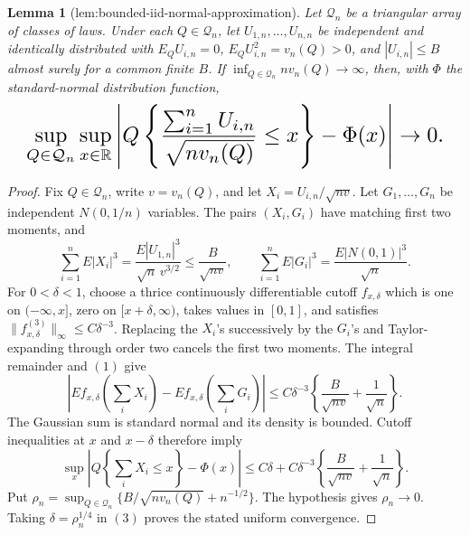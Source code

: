 \documentclass{article}
\newtheorem{lemma}{Lemma}
\begin{document}
\begin{lemma}[lem:bounded-iid-normal-approximation]\label{lem:bounded-iid-normal-approximation}
Let \(\mathcal Q_n\) be a triangular array of classes of laws. Under each \(Q\in\mathcal Q_n\), let \(U_{1,n},\ldots,U_{n,n}\) be independent and identically distributed with \(E_QU_{i,n}=0\), \(E_QU_{i,n}^2=v_n(Q)>0\), and \(|U_{i,n}|\le B\) almost surely for a common finite \(B\). If \(\inf_{Q\in\mathcal Q_n}nv_n(Q)\to\infty\), then, with \(\Phi\) the standard-normal distribution function,
\[
\makebox[\linewidth][c]{\resizebox{0.98\linewidth}{!}{\par\noindent \makebox[\linewidth][c]{\resizebox{0.98\linewidth}{!}{\(\displaystyle \displaystyle \sup_{Q\in\mathcal Q_n}\sup_{x\in\mathbb R}\left|Q\left\{\frac{\sum_{i=1}^nU_{i,n}}{\sqrt{nv_n(Q)}}\le x\right\}-\Phi(x)\right|\to0.\)}}\par\noindent}}
\]
\end{lemma}
\begin{proof}
Fix \(Q\in\mathcal Q_n\), write \(v=v_n(Q)\), and let \(X_i=U_{i,n}/\sqrt{nv}\). Let \(G_1,\ldots,G_n\) be independent \(N(0,1/n)\) variables. The pairs \((X_i,G_i)\) have matching first two moments, and
\[\sum_{i=1}^nE|X_i|^3=\frac{E|U_{1,n}|^3}{\sqrt n\,v^{3/2}}\le\frac{B}{\sqrt{nv}},\qquad \sum_{i=1}^nE|G_i|^3=\frac{E|N(0,1)|^3}{\sqrt n}.\tag{1}\]
For \(0<\delta<1\), choose a thrice continuously differentiable cutoff \(f_{x,\delta}\) which is one on \(( -\infty,x]\), zero on \([x+\delta,\infty)\), takes values in \([0,1]\), and satisfies \(\lVert f_{x,\delta}^{(3)}\rVert_\infty\le C\delta^{-3}\). Replacing the \(X_i\)'s successively by the \(G_i\)'s and Taylor-expanding through order two cancels the first two moments. The integral remainder and \((1)\) give
\[\left|Ef_{x,\delta}\!\left(\sum_iX_i\right)-Ef_{x,\delta}\!\left(\sum_iG_i\right)\right|\le C\delta^{-3}\left\{\frac{B}{\sqrt{nv}}+\frac1{\sqrt n}\right\}.\tag{2}\]
The Gaussian sum is standard normal and its density is bounded. Cutoff inequalities at \(x\) and \(x-\delta\) therefore imply
\[\sup_x\left|Q\left\{\sum_iX_i\le x\right\}-\Phi(x)\right|\le C\delta+C\delta^{-3}\left\{\frac{B}{\sqrt{nv}}+\frac1{\sqrt n}\right\}.\tag{3}\]
Put \(\rho_n=\sup_{Q\in\mathcal Q_n}\{B/\sqrt{nv_n(Q)}+n^{-1/2}\}\). The hypothesis gives \(\rho_n\to0\). Taking \(\delta=\rho_n^{1/4}\) in \((3)\) proves the stated uniform convergence.
\end{proof}
\end{document}
